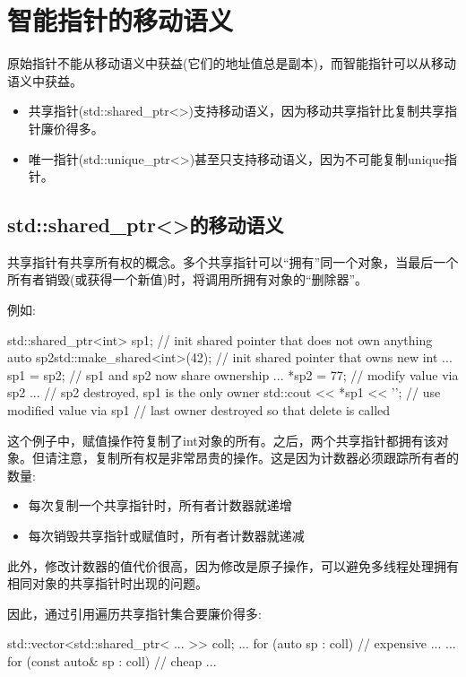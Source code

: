 \section{智能指针的移动语义}
原始指针不能从移动语义中获益(它们的地址值总是副本)，而智能指针可以从移动语义中获益。

\begin{itemize}
	\item 共享指针(std::shared_ptr<>)支持移动语义，因为移动共享指针比复制共享指针廉价得多。
	\item 唯一指针(std::unique_ptr<>)甚至只支持移动语义，因为不可能复制unique指针。
\end{itemize}

\subsection{std::shared_ptr<>的移动语义}

共享指针有共享所有权的概念。多个共享指针可以“拥有”同一个对象，当最后一个所有者销毁(或获得一个新值)时，将调用所拥有对象的“删除器”。

例如:

\begin{cppcode}
{
	std::shared_ptr<int> sp1; // init shared pointer that does not own anything
	{
		auto sp2{std::make_shared<int>(42)}; // init shared pointer that owns new int
		...
		sp1 = sp2; // sp1 and sp2 now share ownership
		...
		*sp2 = 77; // modify value via sp2
		...
	} // sp2 destroyed, sp1 is the only owner
	std::cout << *sp1 << '\n'; // use modified value via sp1
} // last owner destroyed so that delete is called
\end{cppcode}

这个例子中，赋值操作符复制了int对象的所有。之后，两个共享指针都拥有该对象。但请注意，复制所有权是非常昂贵的操作。这是因为计数器必须跟踪所有者的数量:

\begin{itemize}
	\item 每次复制一个共享指针时，所有者计数器就递增
	\item 每次销毁共享指针或赋值时，所有者计数器就递减
\end{itemize}

此外，修改计数器的值代价很高，因为修改是原子操作，可以避免多线程处理拥有相同对象的共享指针时出现的问题。

因此，通过引用遍历共享指针集合要廉价得多:

\begin{cppcode}
std::vector<std::shared_ptr< ... >> coll;
...
for (auto sp : coll) { // expensive
	...
}
...
for (const auto& sp : coll) { // cheap
	...
}
\end{cppcode}

